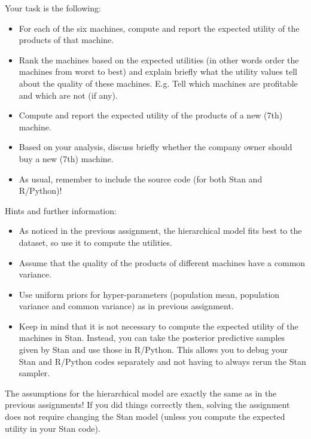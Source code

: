 \documentclass[a4paper,11pt]{article}
\begin{document}
Your task is the following:
\begin{itemize}
\item For each of the six machines, compute and report the expected utility of the products of that machine.
\item Rank the machines based on the expected utilities (in other words order the machines from worst to best) and explain briefly what the utility values tell about the quality of these machines. E.g. Tell which machines are profitable and which are not (if any).
\item Compute and report the expected utility of the products of a new (7th) machine.
\item Based on your analysis, discuss briefly whether the company owner should buy a new (7th) machine.
\item As usual, remember to include the source code (for both Stan and R/Python)!
\end{itemize}

Hints and further information:
\begin{itemize}
\item As noticed in the previous assignment, the hierarchical model fits best to the dataset, so use it to compute the utilities.  
\item Assume that the quality of the products of different machines have a common variance.
\item Use uniform priors for hyper-parameters (population mean, population variance and common variance) as in previous assignment.
\item Keep in mind that it is not necessary to compute the expected utility of the machines in Stan. Instead, you can take the posterior predictive samples given by Stan and use those in R/Python. This allows you to debug your Stan and R/Python codes separately and not having to always rerun the Stan sampler.
\end{itemize}

The assumptions for the hierarchical model are exactly the same as in the previous assignments! If you did things correctly then, solving the assignment does not require changing the Stan model (unless you compute the expected utility in your Stan code). 
\end{document}
